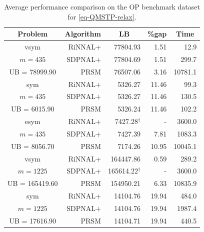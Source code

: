 \documentclass[11pt]{article}
\theoremstyle{plain}
\begin{document}
\begin{table}[h!]
    \centering
    \begin{tabular}{|c|r|r|r|r|}
    \hline
        Problem&Algorithm & \multicolumn{1}{c|}{LB} & {\%gap} &\multicolumn{1}{c|}{Time}\\
        
        \hline
        vsym&RiNNAL+ & 77804.93 &1.51 & 12.9\\
        $m=435$&SDPNAL+ & 77804.69 & 1.51 &299.7\\
        UB = 78999.90&PRSM & 76507.06 & 3.16 & 10781.1\\
        
        \hline
        sym&RiNNAL+ & 5326.27 & 11.46 & 99.3\\
        $m=435$&SDPNAL+ & 5326.27 & 11.46 & 130.5\\
        UB = 6015.90&PRSM & 5326.24 & 11.46 &102.2\\
        
        \hline
        esym&RiNNAL+ & 7427.28$^\dagger$ & - & 3600.0\\
        $m=435$&SDPNAL+ & 7427.39 & 7.81 & 1083.3 \\
        UB = 8056.70&PRSM & 7174.26 & 10.95 & 10045.1\\
        
        \hline
        vsym&RiNNAL+ & 164447.86 & 0.59 & 289.2\\
        $m=1225$&SDPNAL+ &  165614.22$^\dagger$ & - & 3600.0\\
        UB = 165419.60&PRSM & 154950.21 & 6.33 & 10835.9\\
        
        \hline
        sym&RiNNAL+ & 14104.76 & 19.94 & 484.0\\
        $m=1225$&SDPNAL+ & 14104.76 & 19.94 & 1987.4\\
        UB = 17616.90&PRSM & 14104.71 & 19.94 & 440.5\\
        \hline
    \end{tabular}
    \caption{Average performance comparison on the 
    OP benchmark dataset for \eqref{eq-QMSTP-relax}.}
    \label{tab:QMSTP-compare-PRSM}
\end{table}







\end{document}
